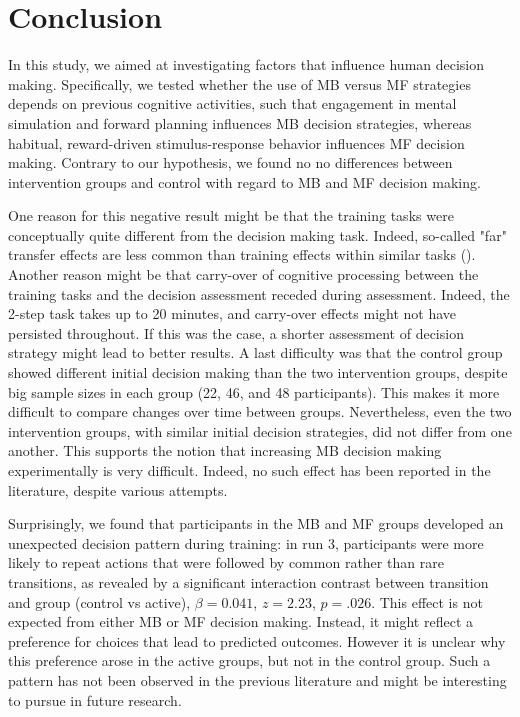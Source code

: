 \documentclass[11pt]{article} %
\begin{document}
\section{Conclusion}
In this study, we aimed at investigating factors that influence human decision making. Specifically, we tested whether the use of MB versus MF strategies depends on previous cognitive activities, such that engagement in mental simulation and forward planning influences MB decision strategies, whereas habitual, reward-driven stimulus-response behavior influences MF decision making. Contrary to our hypothesis, we found no no differences between intervention groups and control with regard to MB and MF decision making.

One reason for this negative result might be that the training tasks were conceptually quite different from the decision making task. Indeed, so-called "far" transfer effects are less common than training effects within similar tasks (\cite{jaeggi_short-_2011}). Another reason might be that carry-over of cognitive processing between the training tasks and the decision assessment receded during assessment. Indeed, the 2-step task takes up to 20 minutes, and carry-over effects might not have persisted throughout. If this was the case, a shorter assessment of decision strategy might lead to better results. A last difficulty was that the control group showed different initial decision making than the two intervention groups, despite big sample sizes in each group (22, 46, and 48 participants). This makes it more difficult to compare changes over time between groups. Nevertheless, even the two intervention groups, with similar initial decision strategies, did not differ from one another. This supports the notion that increasing MB decision making experimentally is very difficult. Indeed, no such effect has been reported in the literature, despite various attempts.

Surprisingly, we found that participants in the MB and MF groups developed an unexpected decision pattern during training: in run 3, participants were more likely to repeat actions that were followed by common rather than rare transitions, as revealed by a significant interaction contrast between transition and group (control vs active), $\beta = 0.041$, $z = 2.23$, $p = .026$. This effect is not expected from either MB or MF decision making. Instead, it might reflect a preference for choices that lead to predicted outcomes. However it is unclear why this preference arose in the active groups, but not in the control group. Such a pattern has not been observed in the previous literature and might be interesting to pursue in future research.
\end{document}
